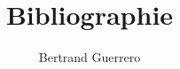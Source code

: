 \documentclass[a4paper,12pt]{report}
\title{Bibliographie}
\author{Bertrand Guerrero}
\date{}
\begin{document}
\cite{ref1}
\cite{ref2}
\cite{ref3}
\cite{ref4}
\cite{ref5}
\cite{ref6}
\cite{ref7}
\cite{ref8}
\cite{ref9}
\cite{ref10}
\cite{ref11}
\cite{ref12}
\cite{ref13}
\cite{ref14}
\cite{ref15}
\cite{ref16}
\cite{ref17}
\cite{ref18}
\cite{ref19}

\end{document}
